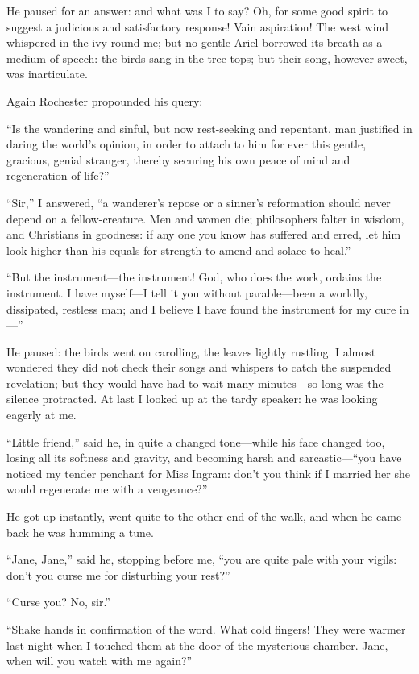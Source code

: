 He paused for an answer: and what was I to say? Oh, for some good
spirit to suggest a judicious and satisfactory response! Vain
aspiration! The west wind whispered in the ivy round me; but no gentle
Ariel borrowed its breath as a medium of speech: the birds sang in the
tree-tops; but their song, however sweet, was inarticulate.

Again \Mr{} Rochester propounded his query:

\enquote{Is the wandering and sinful, but now rest-seeking and
repentant, man justified in daring the world's opinion, in order to
attach to him for ever this gentle, gracious, genial stranger, thereby
securing his own peace of mind and regeneration of life?}

\enquote{Sir,} I answered, \enquote{a wanderer's repose or a sinner's
reformation should never depend on a fellow-creature. Men and women
die; philosophers falter in wisdom, and Christians in goodness: if any
one you know has suffered and erred, let him look higher than his equals
for strength to amend and solace to heal.}

\enquote{But the instrument---the instrument! God, who does the work,
ordains the instrument. I have myself---I tell it you without
parable---been a worldly, dissipated, restless man; and I believe I have
found the instrument for my cure in---}

He paused: the birds went on carolling, the leaves lightly rustling. I
almost wondered they did not check their songs and whispers to catch the
suspended revelation; but they would have had to wait many minutes---so
long was the silence protracted. At last I looked up at the tardy
speaker: he was looking eagerly at me.

\enquote{Little friend,} said he, in quite a changed tone---while his
face changed too, losing all its softness and gravity, and becoming
harsh and sarcastic---\enquote{you have noticed my tender penchant for
Miss Ingram: don't you think if I married her she would regenerate me
with a vengeance?}

He got up instantly, went quite to the other end of the walk, and when
he came back he was humming a tune.

\enquote{Jane, Jane,} said he, stopping before me, \enquote{you are
quite pale with your vigils: don't you curse me for disturbing your
rest?}

\enquote{Curse you? No, sir.}

\enquote{Shake hands in confirmation of the word. What cold fingers! 
They were warmer last night when I touched them at the door of the
mysterious chamber. Jane, when will you watch with me again?}

